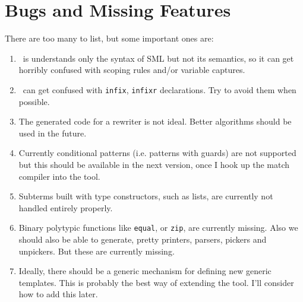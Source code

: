 \section{Bugs and Missing Features}
    There are too many to list, but some important ones are:
  \begin{enumerate}
  \item
   \RewriteGen\ is understands only the syntax of SML but not its semantics,
so it can get horribly confused with scoping rules and/or variable captures.

   \item \RewriteGen\ can get confused with \verb|infix|, \verb|infixr|
        declarations.  Try to avoid them when possible.
  \item
    The generated code for a rewriter is not ideal.  Better algorithms
    should be used in the future.

  \item
   Currently conditional patterns (i.e. patterns with guards) 
are not supported but this should be available in the next version, 
once I hook up the match compiler into the tool.

  \item
   Subterms built with type constructors, such as lists, are currently not
handled entirely properly.  

  \item
   Binary polytypic functions like \verb|equal|, or \verb|zip|, are currently
missing.  Also we should also be able to generate, pretty printers, 
parsers,  pickers and unpickers.  But these are currently missing. 

  \item
   Ideally, there should be a generic mechanism for defining new 
generic templates.  This is probably the best way of extending the
tool.   I'll consider how to add this later.
\end{enumerate}


